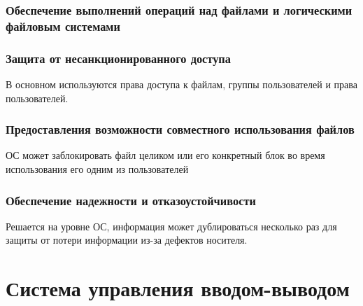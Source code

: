 \documentclass[12pt, a4paper]{article}
\begin{document}
    \subsubsection{Обеспечение выполнений операций над файлами и логическими файловым системами}

    \subsubsection{Защита от несанкционированного доступа}
    В основном используются права доступа к файлам, группы пользователей и права пользователей.
    \subsubsection{Предоставления возможности совместного использования файлов}
    ОС может заблокировать файл целиком или его конкретный блок во время использования его одним из пользователей
    \subsubsection{Обеспечение надежности и отказоустойчивости}
    Решается на уровне ОС, информация может дублироваться несколько раз для защиты от потери информации из-за дефектов носителя.
    \section{Система управления вводом-выводом}
\end{document}
